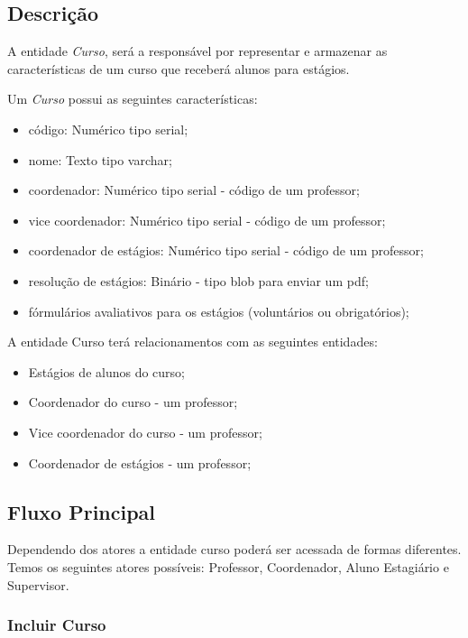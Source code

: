 \subsection{Descrição}
A entidade \emph{Curso}, será a responsável por representar e armazenar as
características de um curso que receberá alunos para estágios.

Um \emph{Curso} possui as seguintes características:

\begin{itemize}
  \item código: Numérico tipo serial;
  \item nome: Texto tipo varchar;
  \item coordenador: Numérico tipo serial - código de um professor;
  \item vice coordenador: Numérico tipo serial - código de um professor;
  \item coordenador de estágios: Numérico tipo serial - código de um professor;
  \item resolução de estágios: Binário - tipo  blob para enviar um pdf;
  \item fórmulários avaliativos para os estágios (voluntários ou obrigatórios);
\end{itemize}

A entidade Curso terá relacionamentos com as seguintes entidades:

\begin{itemize}
  \item Estágios de alunos do curso;
  \item Coordenador do curso - um professor;
  \item Vice coordenador do curso - um professor;
  \item Coordenador de estágios - um professor;
\end{itemize}

\subsection{Fluxo Principal}

Dependendo dos atores a entidade curso poderá ser acessada de formas diferentes.
Temos os seguintes atores possíveis: Professor, Coordenador, Aluno Estagiário e
Supervisor.

\subsubsection{Incluir Curso}

